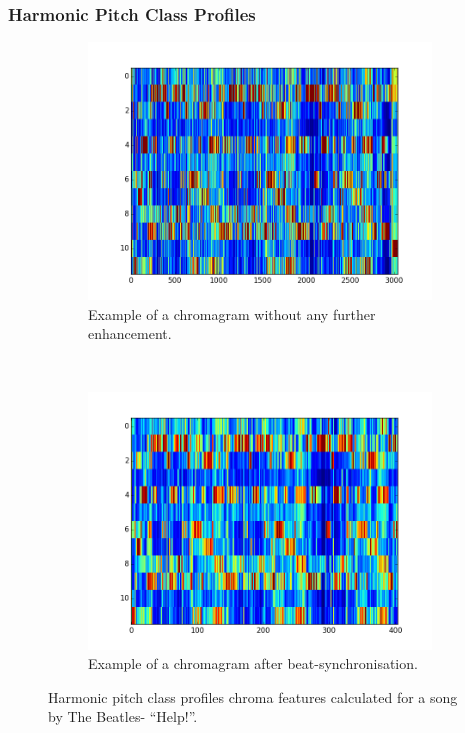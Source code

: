 \subsubsection*{Harmonic Pitch Class Profiles}

\begin{figure}
        \centering
        \begin{subfigure}[b]{0.47\textwidth}
                \includegraphics[width=\textwidth]{Figures/hpcp_unsynched_chroma}
                \caption{Example of a chromagram without any further enhancement. }
                \label{fig:unchroma}
        \end{subfigure}%
        ~ %
        \begin{subfigure}[b]{0.47\textwidth}
                \includegraphics[width=\textwidth]{Figures/hpcp_synched_chroma}
                \caption{Example of a chromagram after beat-synchronisation.}
                \label{fig:synchroma}
        \end{subfigure}
          \caption{Harmonic pitch class profiles chroma features calculated for a song by The Beatles- ``Help!''.}
        \label{fig:chromacomparison}
\end{figure}

